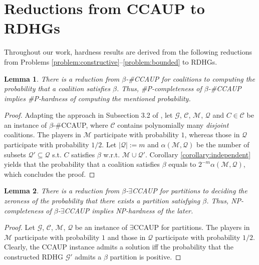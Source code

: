 \documentclass[letterpaper]{article} %
\newtheorem{lemma}{Lemma}
\begin{document}
\section{Reductions from CCAUP to RDHGs} 
Throughout our work, hardness results are derived from the following reductions from Problems \ref{problem:constructive}--\ref{problem:bounded} to RDHGs.
\begin{lemma}
\label{lemma:connection coalitions}
There is a reduction from $\beta$-\#CCAUP for coalitions to computing the probability that a coalition satisfies $\beta$. Thus, \#P-completeness of $\beta$-\#CCAUP implies \#P-hardness of computing the mentioned probability.
\end{lemma} 
\begin{proof}
Adapting the approach in Subsection 3.2 of \cite{imber2021probabilistic}, let $\mathcal{G}$, $\mathcal{C}$, $\mathcal{M}$, $\mathcal{Q}$ and $C \in \mathcal{C}$ be an instance of $\beta$-\#CCAUP, where $\mathcal{C}$ contains polynomially many \textit{disjoint} coalitions. The players in $\mathcal{M}$ participate with probability $1$, whereas those in $\mathcal{Q}$ participate with probability $1/2$. Let $|\mathcal{Q}| := m$ and $\alpha(\mathcal{M}, \mathcal{Q})$ be the number of subsets $\mathcal{Q}' \subseteq \mathcal{Q}$ s.t. $C$ satisfies $\beta$ w.r.t. $\mathcal{M} \cup \mathcal{Q}'$. Corollary \ref{corollary:independent} yields that the probability that a coalition satisfies $\beta$ equals to $2^{-m} \alpha(\mathcal{M}, \mathcal{Q})$, which concludes the proof.
\end{proof}

\begin{lemma}
\label{lemma:connection partitions}
There is a reduction from $\beta$-$\exists$CCAUP for partitions to deciding the zeroness of the probability that there exists a partition satisfying $\beta$. Thus, NP-completeness of $\beta$-$\exists$CCAUP implies NP-hardness of the later.
\end{lemma} 
\begin{proof}
Let $\mathcal{G}$, $\mathcal{C}$, $\mathcal{M}$, $\mathcal{Q}$ be an instance of $\exists$CCAUP for partitions. The players in $\mathcal{M}$ participate with probability $1$ and those in $\mathcal{Q}$ participate with probability $1/2$. Clearly, the CCAUP instance admits a solution iff the probability that the constructed RDHG $\mathcal{G}'$ admits a $\beta$ partition is positive.
\end{proof}
\end{document}
